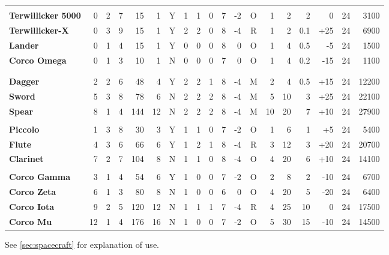 \begin{table}[htbp]
{\begin{minipage}{0.95\textwidth}
\begin{tabular}{lrrrrrcrrrrrcrrrrrr}
        \rowcolor{grey}
        \multicolumn{19}{L}{\textbf{BATTLECRAFT}}\\
        \textbf{Terwillicker 5000} & 0 & 2 & 7 & 15 & 1 & Y & 1 & 1 &
        0 & 7 & -2 & O & 1 & 2 & 2 & 0 & 24 & 3100\\ 
        \textbf{Terwillicker-X} & 0 & 3 & 9 & 15 & 1 & Y & 2 & 2 & 0 &
        8 & -4 & R & 1 & 2 & 0.1 & +25 & 24 & 6900\\ 
        \textbf{Lander} & 0 & 1 & 4 & 15 & 1 & Y & 0 & 0 & 0 & 8 & 0 &
        O & 1 & 4 & 0.5 & -5 & 24 & 1500\\ 
        \textbf{Corco Omega} & 0 & 1 & 3 & 10 & 1 & N & 0 & 0 & 0 & 7
        & 0 & O & 1 & 4 & 0.2 & -15 & 24 & 1100\\
        \rowcolor{grey}
        \multicolumn{19}{L}{\textbf{SPACESHIPS}}\\
        \rowcolor{grey}
        \multicolumn{19}{L}{\textbf{BLADES RI}}\\ 
        \textbf{Dagger} & 2 & 2 & 6 & 48 & 4 & Y & 2 & 2 & 1 & 8 & -4
        & M & 2 & 4 & 0.5 & +15 & 24 & 12200\\ 
        \textbf{Sword} & 5 & 3 & 8 & 78 & 6 & N & 2 & 2 & 2 & 8 & -4 &
        M & 5 & 10 & 3 & +25 & 24 & 22100\\ 
        \textbf{Spear} & 8 & 1 & 4 & 144 & 12 & N & 2 & 2 & 2 & 8 & -4
        & M & 10 & 20 & 7 & +10 & 24 & 27900\\ 
        \rowcolor{grey}
        \multicolumn{19}{L}{\textbf{HARMONICS INC}}\\
        \textbf{Piccolo} & 1 & 3 & 8 & 30 & 3 & Y & 1 & 1 & 0 & 7 & -2
        & O & 1 & 6 & 1 & +5 & 24 & 5400\\ 
        \textbf{Flute} & 4 & 3 & 6 & 66 & 6 & Y & 1 & 2 & 1 & 8 & -4 &
        R & 3 & 12 & 3 & +20 & 24 & 20700\\ 
        \textbf{Clarinet} & 7 & 2 & 7 & 104 & 8 & N & 1 & 1 & 0 & 8 &
        -4 & O & 4 & 20 & 6 & +10 & 24 & 14100\\ 
        \rowcolor{grey}
        \multicolumn{19}{L}{\textbf{CORCO GROUP}}\\
        \textbf{Corco Gamma} & 3 & 1 & 4 & 54 & 6 & Y & 1 & 0 & 0 & 7
        & -2 & O & 2 & 8 & 2 & -10 & 24 & 6700\\ 
        \textbf{Corco Zeta} & 6 & 1 & 3 & 80 & 8 & N & 1 & 0 & 0 & 6 &
        0 & O & 4 & 20 & 5 & -20 & 24 & 6400\\ 
        \textbf{Corco Iota} & 9 & 2 & 5 & 120 & 12 & N & 1 & 1 & 1 & 7
        & -4 & R & 4 & 25 & 10 & 0 & 24 & 17500\\ 
        \textbf{Corco Mu} & 12 & 1 & 4 & 176 & 16 & N & 1 & 0 & 0 & 7
        & -2 & O & 5 & 30 & 15 & -10 & 24 & 14500\\ 
      \end{tabular}
      \parbox{\textwidth}{See \ref{sec:spacecraft} for explanation of use.}
    \end{minipage}}
\end{table}

